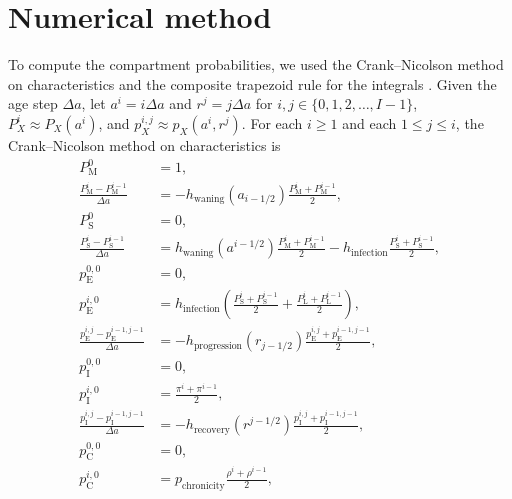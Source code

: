 \documentclass[12pt]{article}
\begin{document}
\section{Numerical method}

To compute the compartment probabilities, we used the Crank--Nicolson
method on characteristics and the composite trapezoid rule for the
integrals \citep{milner_1992}.  Given the age step $\Delta a$, let
$a^i = i \Delta a$ and $r^j = j \Delta a$ for $i, j \in \{0, 1, 2,
\ldots, I - 1\}$, $P_X^i \approx P_X(a^i)$, and $p_X^{i, j} \approx
p_X(a^i, r^j)$.  For each $i \geq 1$ and each $1 \leq j \leq i$, the
Crank--Nicolson method on characteristics is
\begin{equation}
  \begin{split}
    P_{\mathrm{M}}^0 &= 1,
    \\
    \frac{P_{\mathrm{M}}^i - P_{\mathrm{M}}^{i - 1}}{\Delta a}
    &= - h_{\text{waning}}(a_{i - 1 / 2})
    \frac{P_{\mathrm{M}}^i + P_{\mathrm{M}}^{i - 1}}{2},
    \\
    P_{\mathrm{S}}^0 &= 0,
    \\
    \frac{P_{\mathrm{S}}^i - P_{\mathrm{S}}^{i - 1}}{\Delta a}
    &= h_{\text{waning}}(a^{i - 1 / 2})
    \frac{P_{\mathrm{M}}^i + P_{\mathrm{M}}^{i - 1}}{2}
    - h_{\text{infection}}
    \frac{P_{\mathrm{S}}^i + P_{\mathrm{S}}^{i - 1}}{2},
    \\
    p_{\mathrm{E}}^{0, 0} &= 0,
    \\
    p_{\mathrm{E}}^{i, 0} &= h_{\text{infection}}
    \left(\frac{P_{\mathrm{S}}^i + P_{\mathrm{S}}^{i - 1}}{2}
    + \frac{P_{\mathrm{L}}^i + P_{\mathrm{L}}^{i - 1}}{2}\right),
    \\
    \frac{p_{\mathrm{E}}^{i, j} - p_{\mathrm{E}}^{i - 1, j - 1}}{\Delta a}
    &= - h_{\text{progression}}(r_{j - 1 / 2})
    \frac{p_{\mathrm{E}}^{i, j} + p_{\mathrm{E}}^{i - 1, j - 1}}{2},
    \\
    p_{\mathrm{I}}^{0, 0} &= 0,
    \\
    p_{\mathrm{I}}^{i, 0} &=
    \frac{\pi^i + \pi^{i - 1}}{2},
    \\
    \frac{p_{\mathrm{I}}^{i, j} - p_{\mathrm{I}}^{i - 1, j - 1}}{\Delta a}
    &= - h_{\text{recovery}}(r^{j - 1 / 2})
    \frac{p_{\mathrm{I}}^{i, j} + p_{\mathrm{I}}^{i - 1, j - 1}}{2},
    \\
    p_{\mathrm{C}}^{0, 0} &= 0,
    \\
    p_{\mathrm{C}}^{i, 0} &= p_{\text{chronicity}}
    \frac{\rho^i + \rho^{i - 1}}{2},
    \\

\end{split}
\end{equation}
\end{document}
